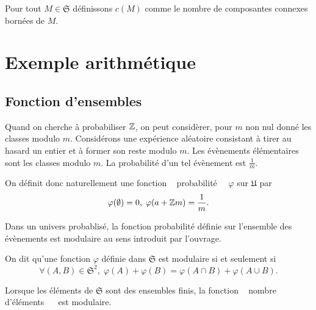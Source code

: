 \begin{defi}
Pour tout $M \in \mathfrak{S}$ définissons $c(M)$ comme le nombre de composantes connexes bornées de $M$.
\end{defi}

\section{Exemple arithmétique}
\subsection{Fonction d'ensembles}
Quand on cherche à probabiliser $\mathbb{Z}$, on peut considèrer, pour $m$ non nul donné les classes modulo $m$. Considérons une expérience aléatoire consistant à tirer au hasard un entier et à former son reste modulo $m$. Les évènements élémentaires sont les classes modulo $m$. La probabilité d'un tel évènement est $\frac{1}{m}$.

On définit donc naturellement une fonction \og~ probabilité~\fg{} \, $\varphi$ sur $\mathfrak{U}$ par
\begin{displaymath}
  \varphi(\emptyset) = 0, \;\varphi(a + \mathbb{Z} m) = \frac{1}{m}.
\end{displaymath}

Dans un univers probablisé, la fonction probabilité définie sur l'ensemble des évènements est modulaire au sens introduit par l'ouvrage.
\begin{defi}
  On dit qu'une fonction $\varphi$ définie dans $\mathfrak{S}$ est modulaire si et seulement si
  \begin{displaymath}
    \forall (A,B)\in \mathfrak{S}^2,\; \varphi(A) + \varphi(B) = \varphi(A\cap B) + \varphi(A \cup B).
  \end{displaymath}
\end{defi}
\begin{rem}
  Lorsque les éléments de $\mathfrak{S}$ sont des ensembles finis, la fonction \og~ nombre d'éléments ~\fg{} \, est modulaire.
\end{rem}

